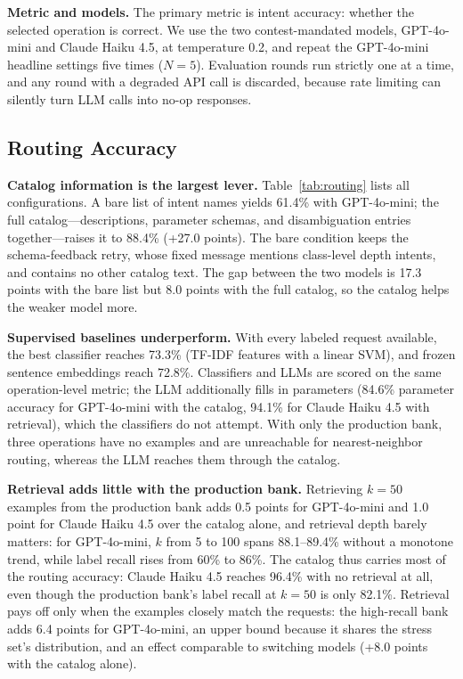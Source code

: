\documentclass[conference,letterpaper]{IEEEtran}
\begin{document}
\textbf{Metric and models.} The primary metric is intent accuracy: whether the
selected operation is correct. We use the two contest-mandated models,
GPT-4o-mini and Claude Haiku 4.5, at temperature 0.2, and repeat the
GPT-4o-mini headline settings five times ($N{=}5$). Evaluation rounds run
strictly one at a time, and any round with a degraded API call is discarded,
because rate limiting can silently turn LLM calls into no-op responses.

\subsection{Routing Accuracy}
\label{sec:routing-acc}
\textbf{Catalog information is the largest lever.} Table~\ref{tab:routing}
lists all configurations. A bare list of intent names
yields 61.4\% with GPT-4o-mini; the full catalog---descriptions, parameter
schemas, and disambiguation entries together---raises it to 88.4\% (+27.0
points). The bare condition keeps the schema-feedback retry, whose fixed
message mentions class-level depth intents, and contains no other catalog
text. The gap between the two models is 17.3 points with the bare list but 8.0
points with the full catalog, so the catalog helps the weaker model more.

\textbf{Supervised baselines underperform.} With every labeled request
available, the best classifier reaches 73.3\% (TF-IDF features with a linear
SVM), and frozen sentence embeddings reach 72.8\%. Classifiers and LLMs are
scored on the same operation-level metric; the LLM additionally fills in
parameters (84.6\% parameter accuracy for GPT-4o-mini with the catalog,
94.1\% for Claude Haiku 4.5 with retrieval), which the classifiers do not
attempt. With only the production bank, three operations have no examples and
are unreachable for nearest-neighbor routing, whereas the LLM reaches them
through the catalog.

\textbf{Retrieval adds little with the production bank.} Retrieving $k{=}50$
examples from the production bank adds 0.5 points for GPT-4o-mini and 1.0
point for Claude Haiku 4.5 over the catalog alone, and retrieval depth barely
matters: for GPT-4o-mini, $k$ from 5 to 100 spans 88.1--89.4\% without a
monotone trend, while label recall rises from 60\% to 86\%. The catalog thus
carries most of the routing accuracy: Claude Haiku 4.5 reaches 96.4\% with no
retrieval at all, even though the production bank's label recall at $k{=}50$
is only 82.1\%. Retrieval pays off only when the examples closely match the
requests: the high-recall bank adds 6.4 points for GPT-4o-mini, an upper bound
because it shares the stress set's distribution, and an effect comparable to
switching models (+8.0 points with the catalog alone).
\end{document}
